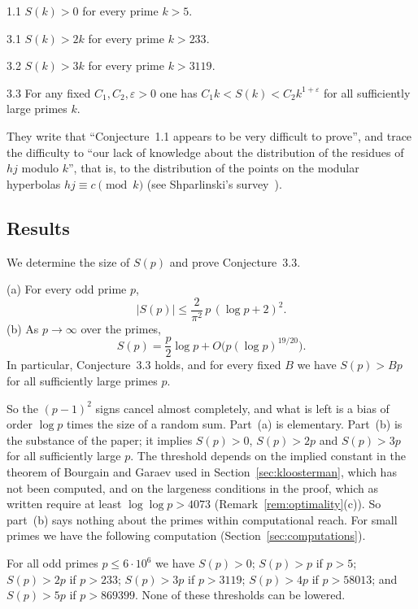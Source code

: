 \begin{bconj}[positivity]{1.1}
$S(k)>0$ for every prime $k>5$.
\end{bconj}
\begin{bconj}{3.1}
$S(k)>2k$ for every prime $k>233$.
\end{bconj}
\begin{bconj}{3.2}
$S(k)>3k$ for every prime $k>3119$.
\end{bconj}
\begin{bconj}[growth]{3.3}
For any fixed $C_1,C_2,\varepsilon>0$ one has $C_1k<S(k)<C_2k^{1+\varepsilon}$ for all sufficiently large primes $k$.
\end{bconj}

They write that ``Conjecture~1.1 appears to be very difficult to prove'', and trace the difficulty to ``our lack of knowledge about the distribution of the residues of $hj$ modulo $k$'', that is, to the distribution of the points on the modular hyperbolas $hj\equiv c\pmod k$ (see Shparlinski's survey~\cite{b25}).

\subsection{Results}
We determine the size of $S(p)$ and prove Conjecture~3.3.

\begin{theorem}\label{thm:main}
\textup{(a)} For every odd prime $p$,
\[
|S(p)|\le\frac2{\pi^2}\,p\,(\log p+2)^2.
\]
\textup{(b)} As $p\to\infty$ over the primes,
\[
S(p)=\frac p2\log p+O\bigl(p(\log p)^{19/20}\bigr).
\]
In particular, Conjecture~\textup{3.3} holds, and for every fixed $B$ we have $S(p)>Bp$ for all sufficiently large primes $p$.
\end{theorem}

So the $(p-1)^2$ signs cancel almost completely, and what is left is a bias of order $\log p$ times the size of a random sum. Part~(a) is elementary. Part~(b) is the substance of the paper; it implies $S(p)>0$, $S(p)>2p$ and $S(p)>3p$ for all sufficiently large $p$. The threshold depends on the implied constant in the theorem of Bourgain and Garaev used in Section~\ref{sec:kloosterman}, which has not been computed, and on the largeness conditions in the proof, which as written require at least $\log\log p>4073$ (Remark~\ref{rem:optimality}(c)). So part~(b) says nothing about the primes within computational reach. For small primes we have the following computation (Section~\ref{sec:computations}).

\begin{proposition}\label{prop:numerics}
For all odd primes $p\le6\cdot10^6$ we have $S(p)>0$; $S(p)>p$ if $p>5$; $S(p)>2p$ if $p>233$; $S(p)>3p$ if $p>3119$; $S(p)>4p$ if $p>58013$; and $S(p)>5p$ if $p>869399$. None of these thresholds can be lowered.
\end{proposition}


